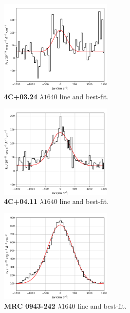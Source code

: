 \begin{appendix}
\begin{figure}
\centering 
  \includegraphics[width=0.5\textwidth]{plots_chp4/4C03_HeII.png}
  \caption[4C+03.24  line and best-fit]{{\bf 4C+03.24}  $\lambda1640$ line and best-fit.}
\end{figure}

\begin{figure}
\centering
 \includegraphics[width=0.5\textwidth]{plots_chp4/4C04_HeII.png}
 \caption[4C+04.11  line and best-fit]{{\bf 4C+04.11}  $\lambda1640$ line and best-fit.}
\end{figure}

\begin{figure}
\centering
 \includegraphics[width=0.5\textwidth]{plots_chp4/MRC0943_HeII.png}
 \caption[MRC 0943-242  line and best-fit]{{\bf MRC 0943-242}  $\lambda1640$ line and best-fit.}
\end{figure}


\end{appendix}
